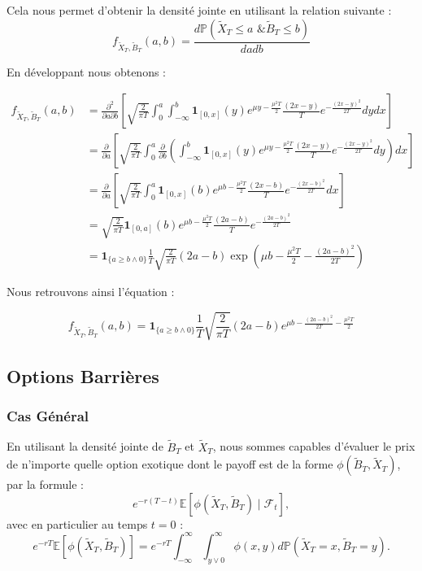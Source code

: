 \documentclass[11pt]{article}
\begin{document}
Cela nous permet d'obtenir la densité jointe en utilisant la relation suivante :
\begin{equation}
    f_{\tilde{X}_T, \tilde{B}_T}(a, b) = \frac{d\mathbb{P}(\tilde{X}_T \le a \text{ \& } \tilde{B}_T \le b)}{da db}
\end{equation}


En développant nous obtenons :

\begin{align*}
\textit{f}_{\tilde{X}_T, \tilde{B}_T}(a, b) &= \frac{\partial^2}{\partial a \partial b} \left[ \sqrt{\frac{2}{\pi T}} \int_0^a \int_{-\infty}^b \mathbf{1}_{[0,x]}(y) e^{\mu y - \frac{\mu^2 T}{2}} \frac{(2x - y)}{T} e^{-\frac{(2x - y)^2}{2T}} dy dx \right] \\
&= \frac{\partial}{\partial a} \left[ \sqrt{\frac{2}{\pi T}} \int_0^a \frac{\partial}{\partial b} \left( \int_{-\infty}^b \mathbf{1}_{[0,x]}(y) e^{\mu y - \frac{\mu^2 T}{2}} \frac{(2x - y)}{T} e^{-\frac{(2x - y)^2}{2T}} dy \right) dx \right] \\
&= \frac{\partial}{\partial a} \left[ \sqrt{\frac{2}{\pi T}} \int_0^a \mathbf{1}_{[0,x]}(b) e^{\mu b - \frac{\mu^2 T}{2}} \frac{(2x - b)}{T} e^{-\frac{(2x - b)^2}{2T}} dx \right] \\
&= \sqrt{\frac{2}{\pi T}} \mathbf{1}_{[0,a]}(b) e^{\mu b - \frac{\mu^2 T}{2}} \frac{(2a - b)}{T} e^{-\frac{(2a - b)^2}{2T}} \\
&= \mathbf{1}_{\{a \ge b \wedge 0\}} \frac{1}{T} \sqrt{\frac{2}{\pi T}} (2a - b) \exp \left( \mu b - \frac{\mu^2 T}{2} - \frac{(2a - b)^2}{2T} \right)
\end{align*}

Nous retrouvons ainsi l'équation :

\begin{equation}
f_{\tilde{X}_T, \tilde{B}_T}(a, b) = \mathbf{1}_{\{a \ge b \wedge 0\}} \frac{1}{T} \sqrt{\frac{2}{\pi T}} (2a - b) e^{\mu b - \frac{(2a - b)^2}{2T} - \frac{\mu^2 T}{2}}
\end{equation}

\subsection{Options Barrières}
\subsubsection{Cas Général}
En utilisant la densité jointe de $\tilde{B}_T$ et $\tilde{X}_T$, nous sommes capables d'évaluer le prix de n'importe quelle option exotique dont le payoff est de la forme $\phi(\tilde{B}_T, \tilde{X}_T)$, par la formule :
\begin{equation}
e^{-r(T-t)} \mathbb{E} \left[ \phi(\tilde{X}_T, \tilde{B}_T) \mid \mathcal{F}_t \right],
\end{equation}
avec en particulier au temps $t=0$ :
\begin{equation}
e^{-rT} \mathbb{E} \left[ \phi(\tilde{X}_T, \tilde{B}_T) \right] = e^{-rT} \int_{-\infty}^{\infty} \int_{y \vee 0}^{\infty} \phi(x, y) d\mathbb{P}(\tilde{X}_T = x, \tilde{B}_T = y).
\end{equation}
\end{document}
